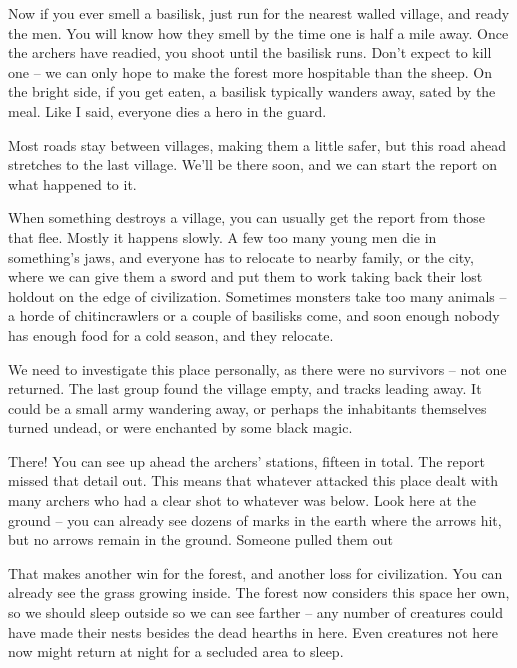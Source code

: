 \begin{multicols}{2}
\begin{exampletext}
  Now if you ever smell a basilisk, just run for the nearest walled village, and ready the men.
  You will know how they smell by the time one is half a mile away.
  Once the archers have readied, you shoot until the basilisk runs.
  Don't expect to kill one -- we can only hope to make the forest more hospitable than the sheep.
  On the bright side, if you get eaten, a basilisk typically wanders away, sated by the meal.
  Like I said, everyone dies a hero in the \gls{guard}.

  Most roads stay between villages, making them a little safer, but this road ahead stretches to the last village.
  We'll be there soon, and we can start the report on what happened to it.

  When something destroys a village, you can usually get the report from those that flee.
  Mostly it happens slowly.
  A few too many young men die in something's jaws, and everyone has to relocate to nearby family, or the city, where we can give them a sword and put them to work taking back their lost holdout on the edge of civilization.
  Sometimes monsters take too many animals -- a horde of chitincrawlers or a couple of basilisks come, and soon enough nobody has enough food for a cold season, and they relocate.

  We need to investigate this place personally, as there were no survivors -- not one returned.
  The last group found the village empty, and tracks leading away.
  It could be a small army wandering away, or perhaps the inhabitants themselves turned undead, or were enchanted by some black magic.

  There! You can see up ahead the archers' stations, fifteen in total.
  The report missed that detail out.
  This means that whatever attacked this place dealt with many archers who had a clear shot to whatever was below.
  Look here at the ground -- you can already see dozens of marks in the earth where the arrows hit, but no arrows remain in the ground.
  Someone pulled them out

  That makes another win for the forest, and another loss for civilization.
  You can already see the grass growing inside.
  The forest now considers this space her own, so we should sleep outside so we can see farther -- any number of creatures could have made their nests besides the dead hearths in here.
  Even creatures not here now might return at night for a secluded area to sleep.

\end{exampletext}


\end{multicols}
